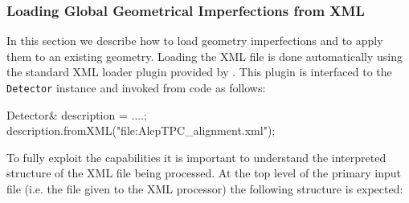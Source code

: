 \documentclass[10pt,a4paper]{article}
\begin{document}
\noindent
\subsubsection{Loading Global Geometrical Imperfections from XML}
\label{sec:ddalign-user-manual-global-misalignment-manip-xml}
\noindent
In this section we describe how to load geometry imperfections and to apply them
to an existing geometry. Loading the XML file is done automatically using the 
standard XML loader plugin provided by \DDhep. This plugin is interfaced to 
the {\tt Detector} instance and invoked from code as follows:
\begin{code}
    Detector& description = ....;
    description.fromXML("file:AlepTPC_alignment.xml");
\end{code}
To fully exploit the capabilities it is important to understand the interpreted 
structure of the XML file being processed. At the top level of the primary 
input file (i.e. the file given to the XML processor) the following structure 
is expected:
\end{document}
